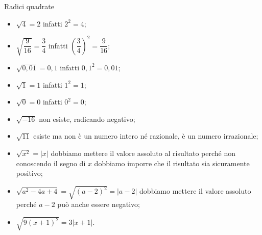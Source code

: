 \begin{exrig}
\begin{esempio}
Radici quadrate
 \begin{multicols}{2}
\begin{itemize}
\item $\sqrt 4=2$ infatti $2^2=4$;
\item $\sqrt{\dfrac 9{16}}=\dfrac 3 4$ infatti $\left(\dfrac 3 4\right)^2=\dfrac 9{16}$;
\item $\sqrt{0,01}=0,1$ infatti $0,1^2=0,01$;
\item $\sqrt 1=1$ infatti $1^2=1$;
\item $\sqrt 0=0$ infatti $0^2=0$;
\item $\sqrt{-16}$ non esiste, radicando negativo;
\item $\sqrt{11}$ esiste ma non è un numero intero né razionale, è un numero irrazionale;
\item $\sqrt{x^2}=\left|x\right|$ dobbiamo mettere il valore assoluto al risultato perché non conoscendo il segno di $x$ dobbiamo imporre che il risultato sia sicuramente positivo;
\item $\sqrt{a^2-4a+4}=\sqrt{(a-2)^2}=\left|a-2\right|$ dobbiamo mettere il valore assoluto perché $a-2$ può anche essere negativo;
\item $\sqrt{9(x+1)^2}=3\left|x+1\right|$.
\end{itemize}
\end{multicols}
\end{esempio}
\end{exrig}

